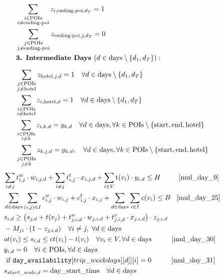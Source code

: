 \begin{align}
    & \sum_{\substack{i \in \text{POIs} \\ i \neq \text{ending-poi}}} z_{i,\text{ending-poi},d_T} = 1 \\
    & \sum_{\substack{j \in \text{POIs} \\ j \neq \text{ending-poi}}} z_{\text{ending-poi},j,d_T} = 0 \\
    & \textbf{3. Intermediate Days } (d \in \text{days} \setminus \{d_1, d_T\}): \notag \\[0.2cm]
    & \sum_{\substack{j \in \text{POIs} \\ j \neq \text{hotel}}} z_{\text{hotel},j,d} = 1 \quad \forall d \in \text{days} \setminus \{d_1, d_T\} \\
    & \sum_{\substack{i \in \text{POIs} \\ i \neq \text{hotel}}} z_{i,\text{hotel},d} = 1 \quad \forall d \in \text{days} \setminus \{d_1, d_T\} \\
    & \sum_{\substack{i \in \text{POIs} \\ i \neq k}} z_{i,k,d} = y_{k,d}
    \quad \forall d \in \text{days},\forall k \in \text{POIs} \setminus \{\text{start}, \text{end}, \text{hotel}\}\\
    & \sum_{\substack{j \in \text{POIs} \\ j \neq k}} z_{k,j,d} = y_{k,d}, \quad \forall d \in \text{days}, \forall k \in \text{POIs} \setminus \{\text{start}, \text{end}, \text{hotel}\}
     \end{align}
\begin{align}
    & \sum_{i \ne j} t^{w}_{i,j} \cdot w_{i,j,d} + \sum_{i \ne j} t^{t}_{i,j} \cdot x_{i,j,d} + \sum_{i \in V} \text{t}(v_i) \cdot y_{i,d} \nonumber \leq H \hspace{0.9cm} \ref{mul_day_9}\\
    & \sum_{d \in \text{days}} \sum_{(i,j) \in I} c^{w}_{i,j} \cdot w_{i,j} + c^{t}_{i,j} \cdot x_{i,j} + \sum_{d \in \text{days}} \sum_{i \in I} c(v_i) \leq B \hspace{0.3cm} \ref{mul_day_25} \notag\\
    & s_{i,d} \geq \left( s_{j,d} + t(v_j) + t^{w}_{j,i,d} \cdot w_{j,i,d} + t^{x}_{j,i,d} \cdot x_{j,i,d} \right) \cdot z_{j,i,d} \notag\\
    &- M_{ji} \cdot (1 - z_{j,i,d}) \quad\forall i \neq j,\; \forall d \in \text{days} \\
    & ot(v_i) \leq s_{i,d} \leq ct(v_i) - t(v_i) \quad \forall v_i \in V, \forall d \in \text{days} \hspace{1cm}\ref{mul_day_30} \notag\\
    & y_{i,d} = 0 \quad \forall i \in \text{POIs}, \forall d \in \text{days} \notag \\& \text{ if } \texttt{day\_availability}[trip\_weekdays][d]][i] = 0 \hspace{1cm}\ref{mul_day_31} \notag\\
    & s_{start\_node,d} = \text{day\_start\_time} \quad \forall d \in \text{days}
\end{align}

